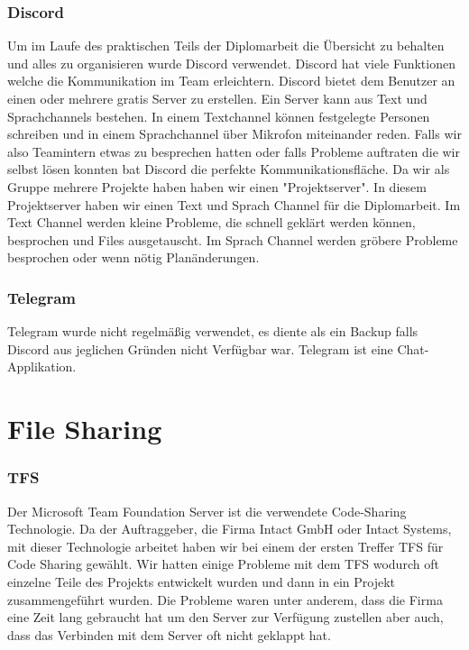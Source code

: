 \subsubsection {Discord}
\label{sec:Discord}
Um im Laufe des praktischen Teils der Diplomarbeit die Übersicht zu behalten und alles zu organisieren wurde Discord verwendet. Discord hat viele Funktionen welche die Kommunikation im Team erleichtern. Discord bietet dem Benutzer an einen oder mehrere gratis Server zu erstellen. Ein Server kann aus Text und Sprachchannels bestehen. In einem Textchannel können festgelegte Personen schreiben und in einem Sprachchannel über Mikrofon miteinander reden. Falls wir also Teamintern etwas zu besprechen hatten oder falls Probleme auftraten die wir selbst lösen konnten bat Discord die perfekte Kommunikationsfläche. 
Da wir als Gruppe mehrere Projekte haben haben wir einen "Projektserver". In diesem Projektserver haben wir einen Text und Sprach Channel für die Diplomarbeit. Im Text Channel werden kleine Probleme, die schnell geklärt werden können, besprochen und Files ausgetauscht. Im Sprach Channel werden gröbere Probleme besprochen oder wenn nötig Planänderungen. 
\subsubsection {Telegram}
\label{sec:Telegram}
Telegram wurde nicht regelmäßig verwendet, es diente als ein Backup falls Discord aus jeglichen Gründen nicht Verfügbar war. Telegram ist eine Chat-Applikation. 
\section{File Sharing}
\label{sec:FileSharing}
\subsubsection {TFS}
\label{sec:TFS}
Der Microsoft Team Foundation Server ist die verwendete Code-Sharing Technologie. Da der Auftraggeber, die Firma Intact GmbH oder Intact Systems, mit dieser Technologie arbeitet haben wir bei einem der ersten Treffer TFS für Code Sharing gewählt. Wir hatten einige Probleme mit dem TFS wodurch oft einzelne Teile des Projekts entwickelt wurden und dann in ein Projekt zusammengeführt wurden. Die Probleme waren unter anderem, dass die Firma eine Zeit lang gebraucht hat um den Server zur Verfügung zustellen aber auch, dass das Verbinden mit dem Server oft nicht geklappt hat. 
